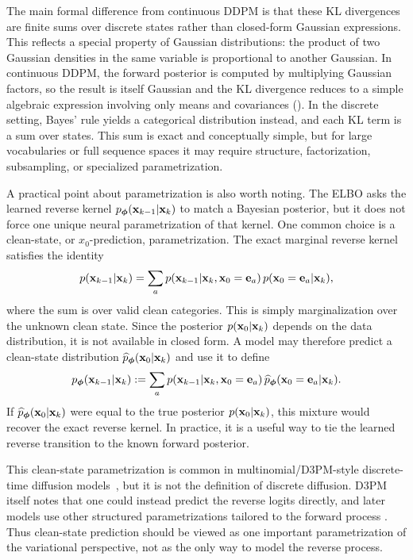 The main formal difference from continuous DDPM is that these KL divergences
are finite sums over discrete states rather than closed-form Gaussian
expressions. This reflects a special property of Gaussian distributions: the product of two Gaussian densities in the same variable is proportional to another Gaussian. In continuous DDPM, the
forward posterior is computed by multiplying Gaussian factors, so the result is itself Gaussian and
the KL divergence reduces to a simple algebraic expression involving
only means and covariances (). In the discrete setting,
Bayes' rule yields a categorical distribution instead, and each KL term is a sum over states. This sum is exact and conceptually simple, but for large vocabularies or full sequence spaces it may require structure, factorization, subsampling, or specialized parametrization.

A practical point about parametrization is also worth noting. The ELBO asks the
learned reverse kernel $p_{{\bm{\phi}}}({\mathbf{x}}_{k-1}|{\mathbf{x}}_k)$ to match a Bayesian
posterior, but it does not force one unique neural parametrization of that
kernel. One common choice is a clean-state, or $x_0$-prediction,
parametrization. The exact marginal reverse kernel satisfies the identity
\[
p({\mathbf{x}}_{k-1}|{\mathbf{x}}_k)
=
\sum_{a}
p({\mathbf{x}}_{k-1}|{\mathbf{x}}_k,{\mathbf{x}}_0={\mathbf{e}}_a)\,
p({\mathbf{x}}_0={\mathbf{e}}_a|{\mathbf{x}}_k),
\]
where the sum is over valid clean categories. This is simply marginalization
over the unknown clean state. Since the posterior $p({\mathbf{x}}_0|{\mathbf{x}}_k)$ depends on
the data distribution, it is not available in closed form. A model may therefore
predict a clean-state distribution $\widehat p_{{\bm{\phi}}}({\mathbf{x}}_0|{\mathbf{x}}_k)$ and use
it to define
\[
p_{{\bm{\phi}}}({\mathbf{x}}_{k-1}|{\mathbf{x}}_k)
:=
\sum_{a}
p({\mathbf{x}}_{k-1}|{\mathbf{x}}_k,{\mathbf{x}}_0={\mathbf{e}}_a)\,
\widehat p_{{\bm{\phi}}}({\mathbf{x}}_0={\mathbf{e}}_a|{\mathbf{x}}_k).
\]
If $\widehat p_{{\bm{\phi}}}({\mathbf{x}}_0|{\mathbf{x}}_k)$ were equal to the true posterior
$p({\mathbf{x}}_0|{\mathbf{x}}_k)$, this mixture would recover the exact reverse kernel. In
practice, it is a useful way to tie the learned reverse transition to the known
forward posterior.

This clean-state parametrization is common in multinomial/D3PM-style
discrete-time diffusion models~\citep{hoogeboom2021argmax,austin2021structured},
but it is not the definition of discrete diffusion. D3PM itself notes that one
could instead predict the reverse logits directly, and later models use other
structured parametrizations tailored to the forward process
\citep{sahoo2024simple}. Thus clean-state prediction should be viewed as one
important parametrization of the variational perspective, not as the only way to
model the reverse process.

